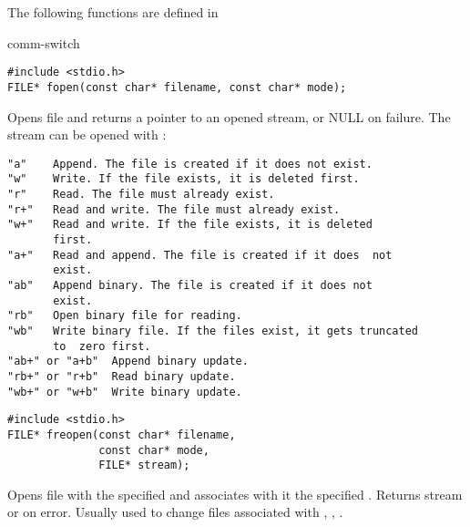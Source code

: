 The following functions are defined in 


\begin{Ventry2}{comm-switch  }

\item[fopen]
\label{item:fopen}

\begin{production}
\begin{verbatim}
#include <stdio.h>
FILE* fopen(const char* filename, const char* mode);
\end{verbatim}
\end{production}

     Opens file  and returns a pointer to an opened
stream, or NULL on failure. The stream can be opened with :

\begin{production}
\begin{verbatim}
"a"    Append. The file is created if it does not exist.
"w"    Write. If the file exists, it is deleted first.
"r"    Read. The file must already exist.
"r+"   Read and write. The file must already exist. 
"w+"   Read and write. If the file exists, it is deleted 
       first.
"a+"   Read and append. The file is created if it does  not 
       exist.
"ab"   Append binary. The file is created if it does not 
       exist. 
"rb"   Open binary file for reading. 
"wb"   Write binary file. If the files exist, it gets truncated 
       to  zero first.
"ab+" or "a+b"  Append binary update.
"rb+" or "r+b"  Read binary update.
"wb+" or "w+b"  Write binary update.
\end{verbatim}
\end{production}


\item[freopen]
\label{item:freopen}
\begin{production}
\begin{verbatim}
#include <stdio.h>
FILE* freopen(const char* filename, 
              const char* mode, 
              FILE* stream);
\end{verbatim}
\end{production}

     Opens file  with the specified  and associates with it the
     specified . Returns stream or  on error. Usually used to change
     files associated with , , .

\item[fflush]
\label{item:fflush}


\end{Ventry2}
